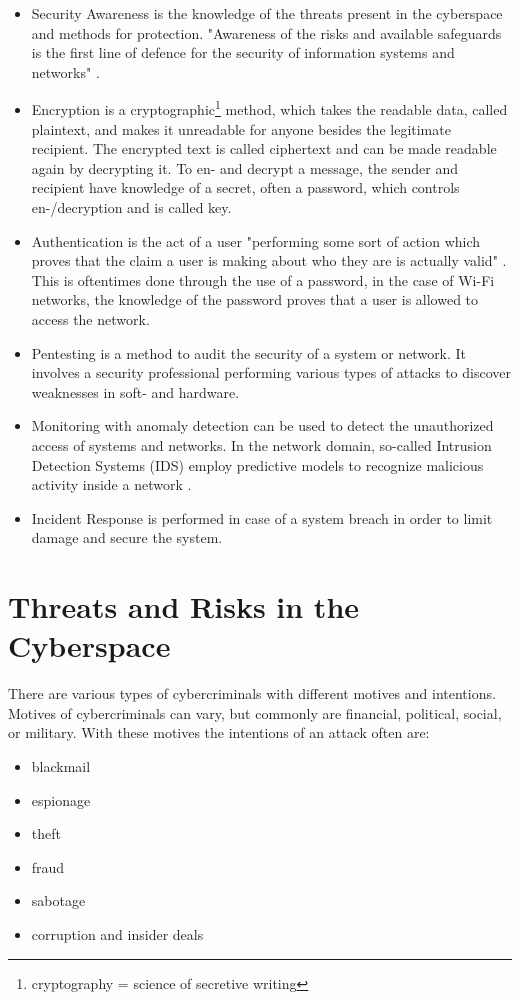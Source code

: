 \begin{itemize}
    \item Security Awareness is the knowledge of the threats present in the cyberspace and methods for protection.
    "Awareness of the risks and available safeguards is the first line of defence for the security of information systems and networks" \cite[page~26]{IT_Basiswissen}.
    \item Encryption is a cryptographic\footnote{cryptography = science of secretive writing} method, which takes the readable data, called plaintext, and makes it unreadable for anyone besides the legitimate recipient.
    The encrypted text is called ciphertext and can be made readable again by decrypting it.
    To en- and decrypt a message, the sender and recipient have knowledge of a secret, often a password, which controls en-/decryption and is called key. \cite[page~1]{Watjen_2018}
    \item Authentication is the act of a user "performing some sort of action which proves that the claim a user is making about who they are is actually valid" \cite{Oriyano_2017}. 
    This is oftentimes done through the use of a password, in the case of Wi-Fi networks, the knowledge of the password proves that a user is allowed to access the network.
    \item Pentesting is a method to audit the security of a system or network. 
    It involves a security professional performing various types of attacks to discover weaknesses in soft- and hardware.
    \item Monitoring with anomaly detection can be used to detect the unauthorized access of systems and networks.
    In the network domain, so-called Intrusion Detection Systems (IDS) employ predictive models to recognize malicious activity inside a network \cite{geeksforgeeks_ids}.
    \item Incident Response is performed in case of a system breach in order to limit damage and secure the system.
\end{itemize}

\section{Threats and Risks in the Cyberspace}
There are various types of cybercriminals with different motives and intentions.
Motives of cybercriminals can vary, but commonly are financial, political, social, or military.
With these motives the intentions of an attack often are:
\begin{multicols}{2}
    \begin{itemize}
        \item blackmail
        \item espionage
        \item theft
        \item fraud
        \item sabotage
        \item corruption and insider deals
    \end{itemize}
\end{multicols}

